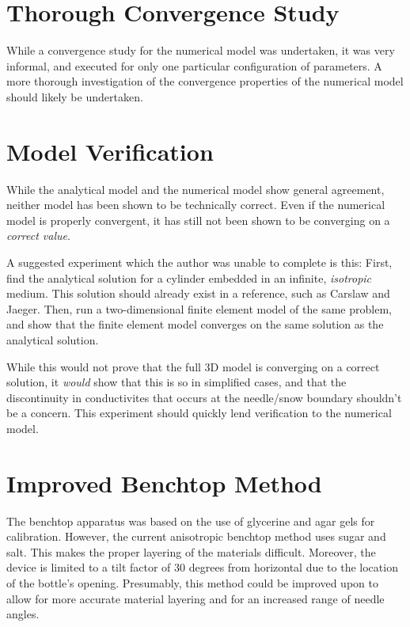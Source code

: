 \section{Thorough Convergence Study}

While a convergence study for the numerical model was undertaken, it was very
informal, and executed for only one particular configuration of parameters. A
more thorough investigation of the convergence properties of the numerical model
should likely be undertaken.

\section{Model Verification}

While the analytical model and the numerical model show general agreement,
neither model has been shown to be technically correct. Even if the numerical
model is properly convergent, it has still not been shown to be converging on
a \emph{correct value}.

A suggested experiment which the author was unable to complete is this: First,
find the analytical solution for a cylinder embedded in an infinite, 
\emph{isotropic} medium. This solution should already exist in a reference, such
as Carslaw and Jaeger. Then, run a two-dimensional finite element model of the
same problem, and show that the finite element model converges on the same
solution as the analytical solution.

While this would not prove that the full 3D model is converging on a correct
solution, it \emph{would} show that this is so in simplified cases, and that the
discontinuity in conductivites that occurs at the needle/snow boundary shouldn't
be a concern. This experiment should quickly lend verification to the numerical
model.

\section{Improved Benchtop Method}

The benchtop apparatus was based on the use of glycerine and agar gels for
calibration. However, the current anisotropic benchtop method uses sugar and
salt. This makes the proper layering of the materials difficult. Moreover, the
device is limited to a tilt factor of \(30\) degrees from horizontal due to the
location of the bottle's opening. Presumably, this method could be improved upon
to allow for more accurate material layering and for an increased range of
needle angles.

